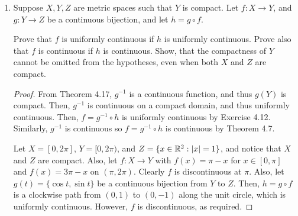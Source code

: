 \begin{enumerate}
\item %
Suppose $X, Y, Z$ are metric spaces such that $Y$ is compact. Let $f: X \to Y$, and $g: Y \to Z$ be a continuous bijection, and let $h = g \circ f$.

Prove that $f$ is uniformly continuous if $h$ is uniformly continuous. Prove also that $f$ is continuous if $h$ is continuous. Show, that the compactness of $Y$ cannot be omitted from the hypotheses, even when both $X$ and $Z$ are compact.

\begin{proof}
    From Theorem 4.17, $g^{-1}$ is a continuous function, and thus $g(Y)$ is compact. Then, $g^{-1}$ is continuous on a compact domain, and thus uniformly continuous. Then, $f = g^{-1} \circ h$ is uniformly continuous by Exercise 4.12. Similarly, $g^{-1}$ is continuous so $f = g^{-1} \circ h$ is continuous by Theorem 4.7.

    Let $X = [0, 2\pi]$, $Y = [0, 2\pi)$, and $Z = \{x \in \mathbb{R}^2: |x| = 1\}$, and notice that $X$ and $Z$ are compact. Also, let $f: X \to Y$ with $f(x) = \pi - x$ for $x \in [0, \pi]$ and $f(x) = 3\pi - x$ on $(\pi, 2\pi)$. Clearly $f$ is discontinuous at $\pi$. Also, let $g(t) = \{\cos t, \sin t\}$ be a continuous bijection from $Y$ to $Z$. Then, $h = g \circ f$ is a clockwise path from $(0, 1)$ to $(0, -1)$ along the unit circle, which is uniformly continuous. However, $f$ is discontinuous, as required. 
\end{proof}
\end{enumerate}
